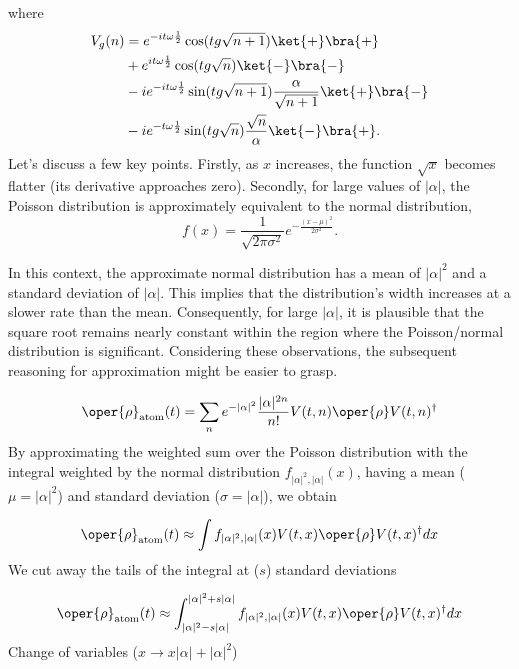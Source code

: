 where
\begin{align}
        \label{eq:appen_JCM_V_g}
    V_g (n) &=e^{-it\omega\frac{1}{2}}  \cos(tg\sqrt{n + 1})\ket{+}\bra{+}\\
&+ e^{it\omega\frac{1}{2}} \cos(tg\sqrt{n})\ket{-}\bra{-}\\
&- ie^{-it\omega\frac{1}{2}} \sin(tg\sqrt{n + 1}) \frac{\alpha}{\sqrt{n + 1}} \ket{+}\bra{-}\\
&- ie^{-t\omega\frac{1}{2}} \sin(tg\sqrt{n}) \frac{\sqrt{n}}{\alpha} \ket{-}\bra{+}.
\end{align}
Let's discuss a few key points. Firstly, as \( x \) increases, the function 
\( \sqrt{x} \) becomes flatter (its derivative approaches zero). Secondly, 
for large values of \( |\alpha| \), the Poisson distribution is approximately 
equivalent to the normal distribution, 
\begin{equation}
f(x) = \frac{1}{\sqrt{2\pi\sigma^2}} e^{-\frac{(x-\mu)^2}{2\sigma^2}}.
\end{equation}

In this context, the approximate normal distribution has a mean of \( |\alpha|^2 \) and a 
standard deviation of \( |\alpha| \). This implies that the distribution's width increases 
at a slower rate than the mean. Consequently, for large \( |\alpha| \), it is plausible 
that the square root remains nearly constant within the region where the Poisson/normal 
distribution is significant. Considering these observations, the subsequent reasoning 
for approximation might be easier to grasp.

\begin{equation}
\oper{\rho}_{\text{atom}}(t) = \sum_{n} e^{-|\alpha|^2} \frac{|\alpha|^{2n}}{n!} V(t, n) \oper{\rho} V(t, n)^{\dagger}
\end{equation}
By approximating the weighted sum over the Poisson distribution with the integral weighted by 
the normal distribution \( f_{|\alpha|^2, |\alpha|}(x) \), having a mean (\( \mu = |\alpha|^2 \)) 
and standard deviation (\( \sigma = |\alpha| \)), we obtain

\begin{equation}
    \oper{\rho}_{\text{atom}}(t)\approx \int f_{|\alpha|^2, |\alpha|}(x) V(t, x) \oper{\rho} V(t, x)^{\dagger} dx
\end{equation}
We cut away the tails of the integral at (\( s \)) standard deviations

\begin{equation}
    \oper{\rho}_{\text{atom}}(t)\approx \int_{|\alpha|^2 - s|\alpha|}^{|\alpha|^2 + s|\alpha|} f_{|\alpha|^2, |\alpha|}(x) V(t, x) \oper{\rho} V(t, x)^{\dagger} dx
\end{equation}
Change of variables (\( x \to x|\alpha| + |\alpha|^2 \))

